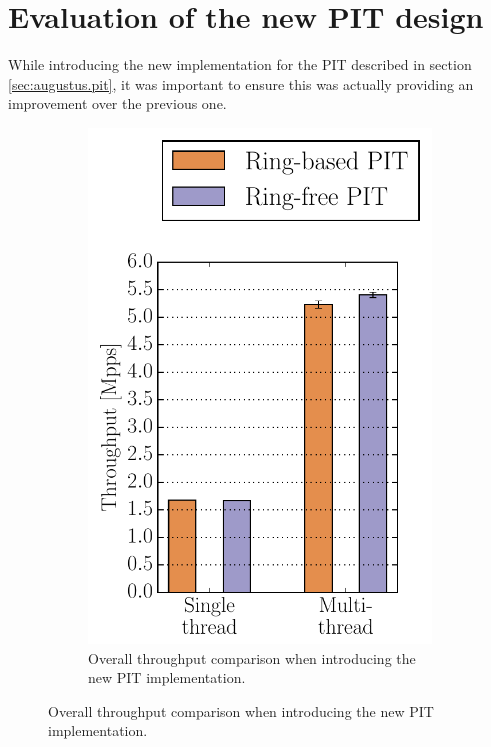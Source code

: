 \documentclass[11pt,a4paper,twoside,titlepage,openany]{book}
\begin{document}
\section{Evaluation of the new PIT design}\label{sec:test.pit}
While introducing the new implementation for the \acrlong{PIT} described in section \ref{sec:augustus.pit}, it was important to ensure this was actually providing an improvement over the previous one.

\begin{figure}[tb]
  \centering
  \begin{subfigure}[t]{.35\textwidth}
    \centering
    \includegraphics[width=\textwidth]{img/pit_thr_cmp.pdf}
    \caption[]{Overall throughput comparison when introducing the new PIT implementation.}

\end{subfigure}
\end{figure}
\end{document}
